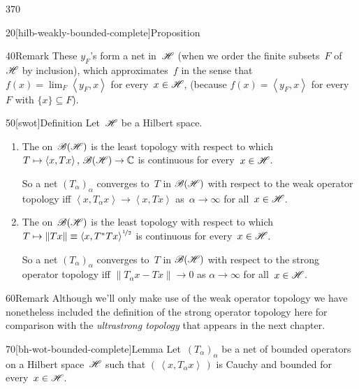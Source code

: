 \begin{parsec}{370}
\begin{point}{20}[hilb-weakly-bounded-complete]{Proposition}
\begin{point}{40}{Remark}
These $y_F$'s form a net in~$\mathscr{H}$
(when we order the finite subsets~$F$ of~$\mathscr{H}$ by inclusion),
which approximates~$f$ in the
sense that~$f(x)=\lim_F \left<y_F,x\right>$
for every~$x\in \mathscr{H}$,
(because 
$f(x)=\left<y_F,x\right>$
for every~$F$
with $\{x\}\subseteq F$).
\end{point}
\end{point}
\begin{point}{50}[swot]{Definition}%
Let~$\mathscr{H}$ be a Hilbert space.
\begin{enumerate}
\item
	The %
on~$\mathscr{B}(\mathscr{H})$ is the least topology
with respect to which $T\mapsto \left<x,Tx\right>,\,\mathscr{B}(\mathscr{H})\to\mathbb{C}$
is continuous for every~$x\in\mathscr{H}$.

So a net $(T_\alpha)_\alpha$
		converges to~$T$ in $\mathscr{B}(\mathscr{H})$
		with respect to the weak operator topology
		iff $\left<x,T_\alpha x\right>\to \left<x,Tx\right>$
		as~$\alpha\to\infty$ for all~$x\in \mathscr{H}$.
\item
	The %
on~$\mathscr{B}(\mathscr{H})$ is the least topology
with respect to which $T\mapsto \|Tx\|\equiv \smash{\left<x,T^*Tx\right>^{%
\nicefrac{1}{2}}}$
is continuous for every~$x\in\mathscr{H}$.

		So a net $(T_\alpha)_\alpha$
		converges to~$T$
		in $\mathscr{B}(\mathscr{H})$
		with respect to the strong operator topology iff
		$\|T_\alpha x -Tx \| \to 0$ as $\alpha\to\infty$
		for all~$x\in\mathscr{H}$.
\end{enumerate}
\spacingfix%
\begin{point}{60}{Remark}%
Although we'll only make use of the weak operator
topology we have nonetheless included
the definition of the strong operator topology here
for comparison
with the \emph{ultrastrong
topology} that appears in the next chapter.
\end{point}
\end{point}
\begin{point}{70}[bh-wot-bounded-complete]{Lemma}%
Let~$(T_\alpha)_\alpha$ be a net of bounded operators
on a Hilbert space~$\mathscr{H}$
such that $(\,\left<x,T_\alpha x \right>\,)$ is
Cauchy and bounded for every~$x\in \mathscr{H}$.


\end{point}
\end{parsec}
